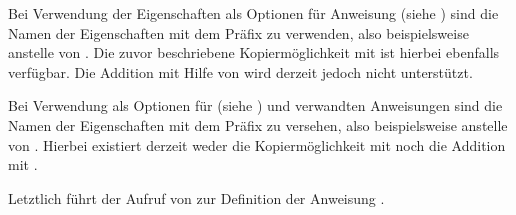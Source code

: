 Bei Verwendung der Eigenschaften als
Optionen für Anweisung
 (siehe
) sind die Namen der Eigenschaften
mit dem Präfix  zu verwenden, also beispielsweise
 anstelle von . Die zuvor beschriebene
Kopiermöglichkeit mit \Option{:=} ist hierbei ebenfalls verfügbar. Die
Addition mit Hilfe von \Option{+=} wird derzeit jedoch nicht unterstützt.

Bei Verwendung als Optionen für
%
%
 (siehe
) und verwandten
Anweisungen sind die Namen der Eigenschaften mit dem Präfix  zu
versehen, also beispielsweise  anstelle von
. Hierbei existiert derzeit weder die Kopiermöglichkeit mit
\Option{:=} noch die Addition mit \Option{+=}.

Letztlich führt der Aufruf von  zur Definition der
Anweisung .

